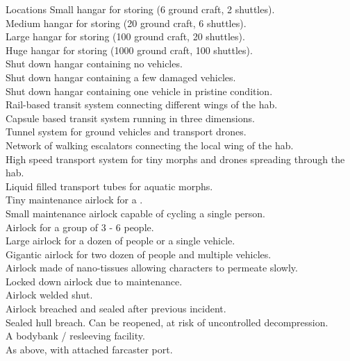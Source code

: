 \documentclass[a4]{book}
\begin{document}
\begin{tableone}{Locations}
Small hangar for storing (6 ground craft, 2 shuttles).\\
Medium hangar for storing (20 ground craft, 6 shuttles).\\
Large hangar for storing (100 ground craft, 20 shuttles).\\
Huge hangar for storing (1000 ground craft, 100 shuttles).\\
Shut down hangar containing no vehicles.\\
Shut down hangar containing a few damaged vehicles.\\
Shut down hangar containing one vehicle in pristine condition.\\
Rail-based transit system connecting different wings of the hab.\\
Capsule based transit system running in three dimensions.\\
Tunnel system for ground vehicles and transport drones.\\
Network of walking escalators connecting the local wing of the hab.\\
High speed transport system for tiny morphs and drones spreading through the hab.\\
Liquid filled transport tubes for aquatic morphs.\\
Tiny maintenance airlock for a .\\
Small maintenance airlock capable of cycling a single person.\\
Airlock for a group of 3 - 6 people.\\
Large airlock for a dozen of people or a single vehicle.\\
Gigantic airlock for two dozen of people and multiple vehicles.\\
Airlock made of nano-tissues allowing characters to permeate slowly.\\
Locked down airlock due to maintenance.\\
Airlock welded shut.\\
Airlock breached and sealed after previous incident.\\
Sealed hull breach. Can be reopened, at risk of uncontrolled decompression.\\
A bodybank / resleeving facility.\\
As above, with attached farcaster port.\\
\end{tableone}
\end{document}
